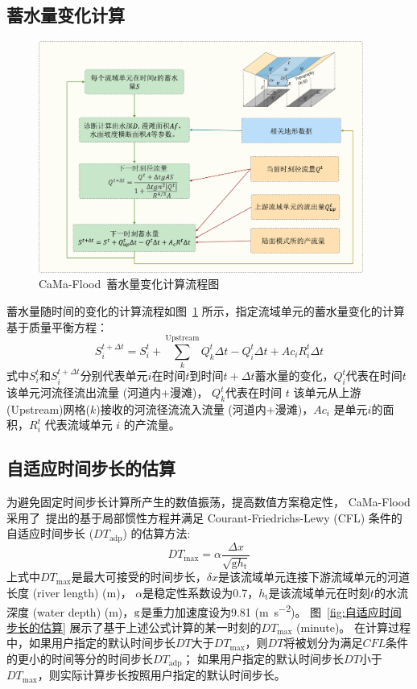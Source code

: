 \subsection{蓄水量变化计算}
{
  \begin{figure}[htbp]
    \centering
    \includegraphics[width=0.95\textwidth]{Figures/陆地表面的水分循环/蓄水量变化计算流程图.png}
    \caption{CaMa-Flood~蓄水量变化计算流程图 }
    \label{fig:蓄水量变化计算流程图}
  \end{figure}
}
蓄水量随时间的变化的计算流程如图~\ref{fig:蓄水量变化计算流程图} 所示，指定流域单元的蓄水量变化的计算基于质量平衡方程：
\begin{equation}
  S_{i}^{t+\Delta t}=S_{i}^{t}+\sum_{k}^{\text{Upstream}} Q_{k}^{t} \Delta t-Q_{i}^{t} \Delta t+A c_{i} R_{i}^{t} \Delta t
\end{equation}
式中$S_{i}^{t}$和$S_{i}^{t+\Delta t}$分别代表单元$i$在时间$t$到时间$t+\Delta t$蓄水量的变化，$Q_{i} ^t$代表在时间$t$该单元河流径流出流量 (河道内+漫滩)，
$Q_k^t$代表在时间 $t$ 该单元从上游(Upstream)网格($k$)接收的河流径流流入流量 (河道内+漫滩)，$Ac_i$ 是单元$i$的面积，$R_i^t$ 代表流域单元 $i$ 的产流量。


\subsection{自适应时间步长的估算}
为避免固定时间步长计算所产生的数值振荡，提高数值方案稳定性，
CaMa-Flood 采用了~\citet{bates2010}提出的基于局部惯性方程并满足 Courant-Friedrichs-Lewy (CFL)
条件的自适应时间步长 ($DT_{\mathrm{adp}}$) 的估算方法:
\begin{equation}
  {DT}_{\max }={\alpha} \frac{\Delta x}{\sqrt{{\mathrm {g}} h_{\mathrm{t}}}}
\end{equation}
上式中$DT_{\mathrm{max}}$是最大可接受的时间步长，$\delta{x}$是该流域单元连接下游流域单元的河道长度 (river length) (\unit{m})，
$\alpha$是稳定性系数设为0.7，$h_{\mathrm {t}} $是该流域单元在时刻$t$的水流深度 (water depth) (\unit{m})，$\rm g$是重力加速度设为9.81 (\unit{m.s^{-2}})。
图~\ref{fig:自适应时间步长的估算} 展示了基于上述公式计算的某一时刻的$DT_{\mathrm{max}}$ (minute)。
在计算过程中，如果用户指定的默认时间步长$DT$大于$DT_{\mathrm{max}}$，则$DT$将被划分为满足$CFL$条件的更小的时间等分的时间步长$DT_{\mathrm{adp}}$；
如果用户指定的默认时间步长$DT$小于$DT_{\mathrm{max}}$，则实际计算步长按照用户指定的默认时间步长。

